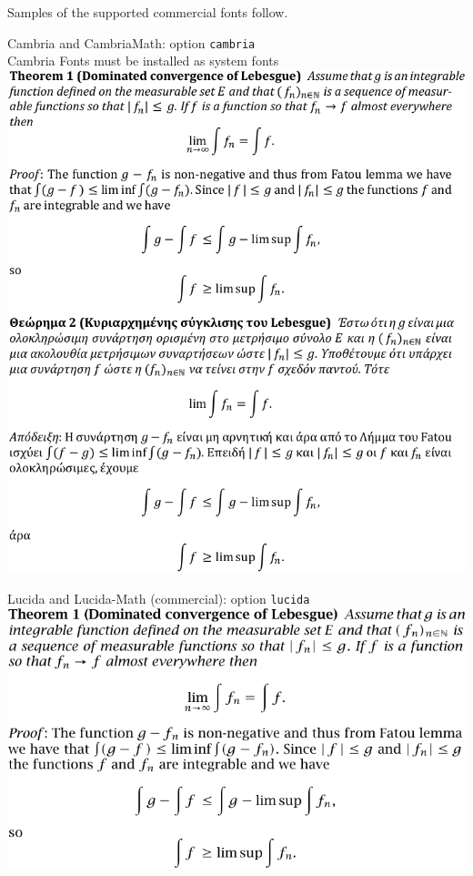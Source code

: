 \documentclass{book}
\begin{document}
\bigskip




Samples of the supported commercial fonts follow.

\newpage

\begin{center}
{\Large Cambria and CambriaMath: option \verb|cambria|}\\
Cambria Fonts must be installed as system fonts\\[1cm] 
\includegraphics[scale=1.2]{fspsample-cambria.pdf}
\end{center}

\newpage

\begin{center}
{\Large Lucida and Lucida-Math (commercial): option \verb|lucida|}\\[1cm] 
\includegraphics[scale=1.2]{fspsample-lucida.pdf}
\end{center}
\end{document}

